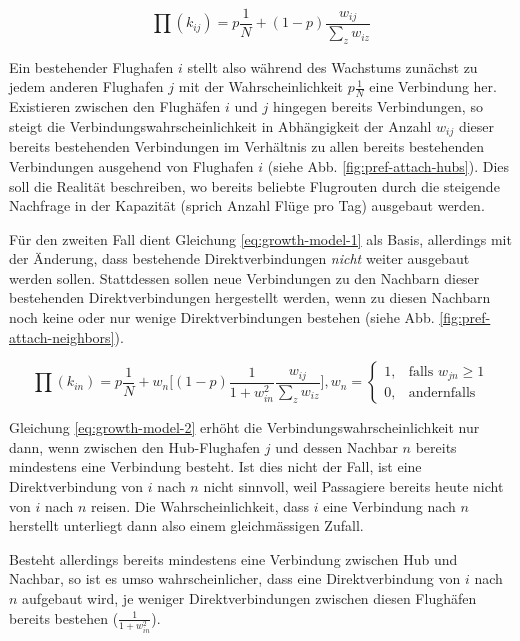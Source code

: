 \begin{equation}
    \label{eq:growth-model-1}
    \prod (k_{ij}) = p\frac{1}{N} + (1-p)\frac{w_{ij}}{\sum_{z}w_{iz}}
\end{equation}

Ein bestehender Flughafen $i$ stellt also während des Wachstums zunächst zu jedem anderen Flughafen $j$ mit der Wahrscheinlichkeit
$p \frac{1}{N}$ eine Verbindung her.
Existieren zwischen den Flughäfen $i$ und $j$ hingegen bereits Verbindungen, so steigt die Verbindungswahrscheinlichkeit in Abhängigkeit
der Anzahl $w_{ij}$ dieser bereits bestehenden Verbindungen im Verhältnis zu allen bereits bestehenden Verbindungen ausgehend von Flughafen $i$ (siehe Abb. \ref{fig:pref-attach-hubs}).
Dies soll die Realität beschreiben, wo bereits beliebte Flugrouten durch die steigende Nachfrage in der Kapazität (sprich Anzahl Flüge pro Tag)
ausgebaut werden.

Für den zweiten Fall dient Gleichung \ref{eq:growth-model-1} als Basis, allerdings mit der Änderung, dass bestehende Direktverbindungen \textit{nicht} weiter
ausgebaut werden sollen.
Stattdessen sollen neue Verbindungen zu den Nachbarn dieser bestehenden Direktverbindungen hergestellt werden, wenn zu diesen Nachbarn noch keine
oder nur wenige Direktverbindungen bestehen (siehe Abb. \ref{fig:pref-attach-neighbors}).

\begin{equation}
    \label{eq:growth-model-2}
    \prod (k_{in}) = p\frac{1}{N} + w_{n}\Bigg[ (1-p)\frac{1}{1 + w_{in}^{2}}\frac{w_{ij}}{\sum_{z}w_{iz}} \Bigg], w_{n} = \begin{cases}1,& \text{falls } w_{jn}\geq 1\\ 0, & \text{andernfalls}
    \end{cases}
\end{equation}

Gleichung \ref{eq:growth-model-2} erhöht die Verbindungswahrscheinlichkeit nur dann, wenn zwischen den Hub-Flughafen $j$ und dessen Nachbar $n$ bereits mindestens eine Verbindung besteht.
Ist dies nicht der Fall, ist eine Direktverbindung von $i$ nach $n$ nicht sinnvoll, weil Passagiere bereits heute nicht von $i$ nach $n$ reisen.
Die Wahrscheinlichkeit, dass $i$ eine Verbindung nach $n$ herstellt unterliegt dann also einem gleichmässigen Zufall.

Besteht allerdings bereits mindestens eine Verbindung zwischen Hub und Nachbar, so ist es umso wahrscheinlicher, dass eine Direktverbindung von $i$ nach $n$ aufgebaut wird,
je weniger Direktverbindungen zwischen diesen Flughäfen bereits bestehen ($ \frac{1}{1 + w_{in}^{2}}$).

